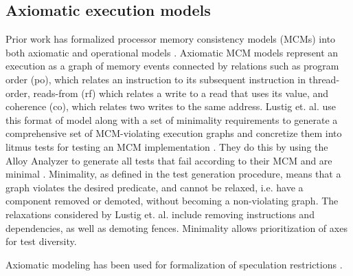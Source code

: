 \subsection{Axiomatic execution models}\label{sec:bg-axiomatic}
Prior work has formalized processor memory consistency models (MCMs) into both axiomatic and operational models \cite{herdingcats}. Axiomatic MCM models represent an execution as a graph of memory events connected by relations such as program order (po), which relates an instruction to its subsequent instruction in thread-order, reads-from (rf) which relates a write to a read that uses its value, and coherence (co), which relates two writes to the same address. Lustig et. al. use this format of model along with a set of minimality requirements to generate a comprehensive set of MCM-violating execution graphs and concretize them into litmus tests for testing an MCM implementation \cite{lustig}. They do this by using the Alloy Analyzer \cite{jackson2002alloy} to generate all tests that fail according to their MCM and are minimal
\notebr
{}
\notebr
{}. Minimality, as defined in the test generation procedure, means that a graph violates the desired predicate, and cannot be relaxed, i.e. have a component removed or demoted, without becoming a non-violating graph. The relaxations considered by Lustig et. al. include removing instructions and dependencies, as well as demoting fences. Minimality allows prioritization of axes for test diversity.

Axiomatic modeling has been used for formalization of speculation restrictions . 

